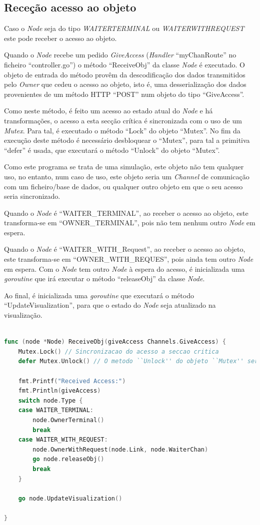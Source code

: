 \subsection*{Receção acesso ao objeto}
Caso o \emph{Node} seja do tipo \emph{WAITER\textunderscore TERMINAL} ou \emph{WAITER\textunderscore WITH\textunderscore REQUEST}
este pode receber o acesso ao objeto.

Quando o \emph{Node} recebe um pedido \emph{GiveAccess} (\emph{Handler} ``myChanRoute'' no ficheiro ``controller.go'') o
método ``ReceiveObj'' da classe \emph{Node} é executado.
O objeto de entrada do método provêm da descodificação dos dados transmitidos pelo \emph{Owner}
que cedeu o acesso ao objeto, isto é, uma desserialização dos dados provenientes de um método \acs{HTTP} ``POST''
num objeto do tipo ``GiveAccess''.


Como neste método, é feito um acesso ao estado atual do \emph{Node} e há transformações, 
o acesso a esta secção crítica é sincronizada com o uso de um \emph{Mutex}.
Para tal, é executado o método ``Lock'' do objeto ``Mutex''.
No fim da execução deste método é necessário desbloquear o ``Mutex'', para tal 
a primitiva ``defer'' é usada, que executará o método ``Unlock'' do objeto ``Mutex''.

Como este programa se trata de uma simulação, este objeto não tem qualquer uso,
no entanto, num caso de uso,
este objeto seria um \emph{Channel} de comunicação com um ficheiro/base de dados, ou qualquer outro
objeto em que o seu acesso seria sincronizado.


Quando o \emph{Node} é ``WAITER\_TERMINAL'', ao receber o acesso ao objeto,
este transforma-se em ``OWNER\_TERMINAL'', pois não tem nenhum outro \emph{Node} em espera.


Quando o \emph{Node} é ``WAITER\_WITH\_Request'', ao receber o acesso ao objeto,
este transforma-se em ``OWNER\_WITH\_REQUES'', pois ainda tem outro \emph{Node} em espera.
Com o \emph{Node} tem outro \emph{Node} à espera do acesso, é inicializada uma \emph{goroutine}
que irá executar o método ``releaseObj'' da classe \emph{Node}.


Ao final, é inicializada uma \emph{goroutine} que executará 
o método ``UpdateVisualization'', para que o estado do \emph{Node}
seja atualizado na visualização.


\begin{lstlisting}[caption={Método ``ReceiveObj''},language=Go]

func (node *Node) ReceiveObj(giveAccess Channels.GiveAccess) {
	Mutex.Lock() // Sincronizacao do acesso a seccao critica
	defer Mutex.Unlock() // O metodo ``Unlock'' do objeto ``Mutex'' sera executado caso o metodo ``Request'' termine

	fmt.Printf("Received Access:")
	fmt.Println(giveAccess)
	switch node.Type {
	case WAITER_TERMINAL:
		node.OwnerTerminal()
		break
	case WAITER_WITH_REQUEST:
		node.OwnerWithRequest(node.Link, node.WaiterChan)
		go node.releaseObj()
		break
	}

	go node.UpdateVisualization()

}

\end{lstlisting}

